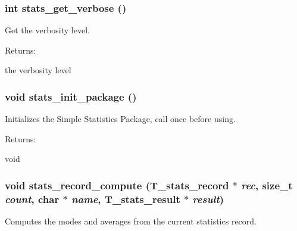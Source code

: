 \subsubsection{\setlength{\rightskip}{0pt plus 5cm}int stats\_\-get\_\-verbose ()}\label{bucket__stats_8h_a12}


Get the verbosity level.

\begin{Desc}
\item[Returns: ]\par
the verbosity level \end{Desc}
\subsubsection{\setlength{\rightskip}{0pt plus 5cm}void stats\_\-init\_\-package ()}\label{bucket__stats_8h_a8}


Initializes the Simple Statistics Package, call once before using.

\begin{Desc}
\item[Returns: ]\par
void \end{Desc}
\subsubsection{\setlength{\rightskip}{0pt plus 5cm}void stats\_\-record\_\-compute ({\bf T\_\-stats\_\-record} $\ast$ {\em rec}, size\_\-t {\em count}, char $\ast$ {\em name}, {\bf T\_\-stats\_\-result} $\ast$ {\em result})}\label{bucket__stats_8h_a11}


Computes the modes and averages from the current statistics record.

